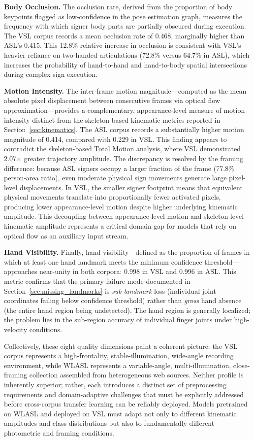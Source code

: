 \documentclass{ieeeaccess}
\begin{document}
\textbf{Body Occlusion.} The occlusion rate, derived from the proportion of body keypoints flagged as low-confidence in the pose estimation graph, measures the frequency with which signer body parts are partially obscured during execution. The VSL corpus records a mean occlusion rate of 0.468, marginally higher than ASL's 0.415. This 12.8\% relative increase in occlusion is consistent with VSL's heavier reliance on two-handed articulations (72.8\% versus 64.7\% in ASL), which increases the probability of hand-to-hand and hand-to-body spatial intersections during complex sign execution.

\textbf{Motion Intensity.} The inter-frame motion magnitude—computed as the mean absolute pixel displacement between consecutive frames via optical flow approximation—provides a complementary, appearance-level measure of motion intensity distinct from the skeleton-based kinematic metrics reported in Section~\ref{sec:kinematics}. The ASL corpus records a substantially higher motion magnitude of 0.414, compared with 0.229 in VSL. This finding appears to contradict the skeleton-based Total Motion analysis, where VSL demonstrated 2.07$\times$ greater trajectory amplitude. The discrepancy is resolved by the framing difference: because ASL signers occupy a larger fraction of the frame ($77.8\%$ person-area ratio), even moderate physical sign movements generate large pixel-level displacements. In VSL, the smaller signer footprint means that equivalent physical movements translate into proportionally fewer activated pixels, producing lower appearance-level motion despite higher underlying kinematic amplitude. This decoupling between appearance-level motion and skeleton-level kinematic amplitude represents a critical domain gap for models that rely on optical flow as an auxiliary input stream.

\textbf{Hand Visibility.} Finally, hand visibility—defined as the proportion of frames in which at least one hand landmark meets the minimum confidence threshold—approaches near-unity in both corpora: 0.998 in VSL and 0.996 in ASL. This metric confirms that the primary failure mode documented in Section~\ref{sec:missing_landmarks} is \textit{sub-landmark} loss (individual joint coordinates failing below confidence threshold) rather than \textit{gross} hand absence (the entire hand region being undetected). The hand region is generally localized; the problem lies in the sub-region accuracy of individual finger joints under high-velocity conditions.

Collectively, these eight quality dimensions paint a coherent picture: the VSL corpus represents a high-frontality, stable-illumination, wide-angle recording environment, while WLASL represents a variable-angle, multi-illumination, close-framing collection assembled from heterogeneous web sources. Neither profile is inherently superior; rather, each introduces a distinct set of preprocessing requirements and domain-adaptive challenges that must be explicitly addressed before cross-corpus transfer learning can be reliably deployed. Models pretrained on WLASL and deployed on VSL must adapt not only to different kinematic amplitudes and class distributions but also to fundamentally different photometric and framing conditions.
\end{document}
